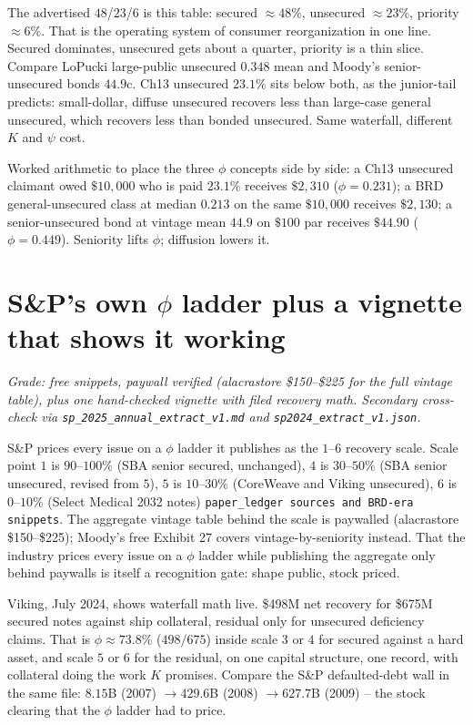 The advertised $48$/$23$/$6$ is this table: secured $\approx48\%$, unsecured $\approx23\%$, priority $\approx6\%$. That is the operating system of consumer reorganization in one line. Secured dominates, unsecured gets about a quarter, priority is a thin slice. Compare LoPucki large-public unsecured $0.348$ mean and Moody's senior-unsecured bonds $44.9$c. Ch13 unsecured $23.1\%$ sits below both, as the junior-tail predicts: small-dollar, diffuse unsecured recovers less than large-case general unsecured, which recovers less than bonded unsecured. Same waterfall, different $K$ and $\psi$ cost.

Worked arithmetic to place the three $\phi$ concepts side by side: a Ch13 unsecured claimant owed $\$10{,}000$ who is paid $23.1\%$ receives $\$2{,}310$ ($\phi=0.231$); a BRD general-unsecured class at median $0.213$ on the same $\$10{,}000$ receives $\$2{,}130$; a senior-unsecured bond at vintage mean $44.9$ on $\$100$ par receives $\$44.90$ ($\phi=0.449$). Seniority lifts $\phi$; diffusion lowers it.

\section{S\&P's own $\phi$ ladder plus a vignette that shows it working}
\label{sec:sp-scale}

\textit{Grade: free snippets, paywall verified (alacrastore \$150--\$225 for the full vintage table), plus one hand-checked vignette with filed recovery math. Secondary cross-check via \texttt{sp\_2025\_annual\_extract\_v1.md} and \texttt{sp2024\_extract\_v1.json}.}

S\&P prices every issue on a $\phi$ ladder it publishes as the $1$--$6$ recovery scale. Scale point $1$ is $90$--$100\%$ (SBA senior secured, unchanged), $4$ is $30$--$50\%$ (SBA senior unsecured, revised from $5$), $5$ is $10$--$30\%$ (CoreWeave and Viking unsecured), $6$ is $0$--$10\%$ (Select Medical 2032 notes) \texttt{paper\_ledger sources and BRD-era snippets}. The aggregate vintage table behind the scale is paywalled (alacrastore \$150--\$225); Moody's free Exhibit 27 covers vintage-by-seniority instead. That the industry prices every issue on a $\phi$ ladder while publishing the aggregate only behind paywalls is itself a recognition gate: shape public, stock priced.

Viking, July 2024, shows waterfall math live. \$498M net recovery for \$675M secured notes against ship collateral, residual only for unsecured deficiency claims. That is $\phi\approx73.8\%$ ($498/675$) inside scale $3$ or $4$ for secured against a hard asset, and scale $5$ or $6$ for the residual, on one capital structure, one record, with collateral doing the work $K$ promises. Compare the S\&P defaulted-debt wall in the same file: $8.15$B (2007) $\to 429.6$B (2008) $\to 627.7$B (2009) -- the stock clearing that the $\phi$ ladder had to price.

